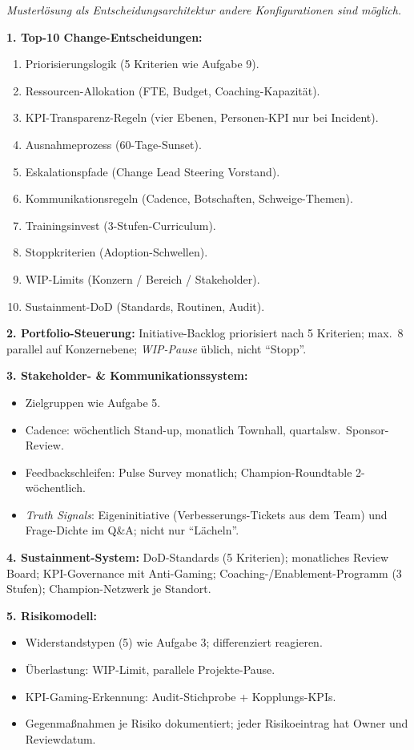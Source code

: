 \documentclass[11pt,a4paper,oneside]{article}
\begin{document}
\begin{loesungbox}
\emph{Musterl\"osung als Entscheidungsarchitektur \textendash{} andere Konfigurationen sind m\"oglich.}

\smallskip
\textbf{1. Top-10 Change-Entscheidungen:}
\begin{enumerate}
  \item Priorisierungslogik (5 Kriterien wie Aufgabe 9).
  \item Ressourcen-Allokation (FTE, Budget, Coaching-Kapazit\"at).
  \item KPI-Transparenz-Regeln (vier Ebenen, Personen-KPI nur bei Incident).
  \item Ausnahmeprozess (60-Tage-Sunset).
  \item Eskalationspfade (Change Lead \textrightarrow{} Steering \textrightarrow{} Vorstand).
  \item Kommunikationsregeln (Cadence, Botschaften, Schweige-Themen).
  \item Trainingsinvest (3-Stufen-Curriculum).
  \item Stoppkriterien (Adoption-Schwellen).
  \item WIP-Limits (Konzern / Bereich / Stakeholder).
  \item Sustainment-DoD (Standards, Routinen, Audit).
\end{enumerate}

\smallskip
\textbf{2. Portfolio-Steuerung:} Initiative-Backlog priorisiert nach 5 Kriterien; max.\ 8 parallel auf Konzernebene; \emph{WIP-Pause} \"ublich, nicht ``Stopp''.

\smallskip
\textbf{3. Stakeholder- \& Kommunikationssystem:}
\begin{itemize}
  \item Zielgruppen wie Aufgabe 5.
  \item Cadence: w\"ochentlich Stand-up, monatlich Townhall, quartalsw.\ Sponsor-Review.
  \item Feedbackschleifen: Pulse Survey monatlich; Champion-Roundtable 2-w\"ochentlich.
  \item \emph{Truth Signals}: Eigeninitiative (Verbesserungs-Tickets aus dem Team) und Frage-Dichte im Q\&A; nicht nur ``L\"acheln''.
\end{itemize}

\smallskip
\textbf{4. Sustainment-System:} DoD-Standards (5 Kriterien); monatliches Review Board; KPI-Governance mit Anti-Gaming; Coaching-/Enablement-Programm (3 Stufen); Champion-Netzwerk je Standort.

\smallskip
\textbf{5. Risikomodell:}
\begin{itemize}
  \item Widerstandstypen (5) wie Aufgabe 3; differenziert reagieren.
  \item \"Uberlastung: WIP-Limit, parallele Projekte-Pause.
  \item KPI-Gaming-Erkennung: Audit-Stichprobe + Kopplungs-KPIs.
  \item Gegenma{\ss}nahmen je Risiko dokumentiert; jeder Risikoeintrag hat Owner und Reviewdatum.
\end{itemize}


\end{loesungbox}
\end{document}
